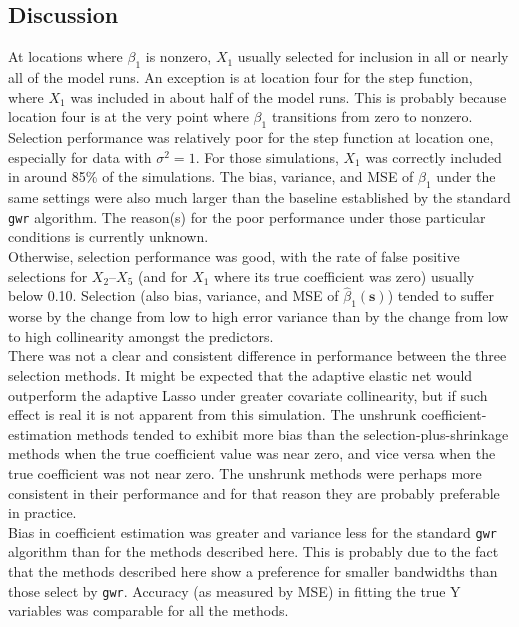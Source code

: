 \documentclass[authoryear, review, 11pt]{elsarticle}
\begin{document}
		
	\subsection{Discussion}
	At locations where $\beta_1$ is nonzero, $X_1$ usually selected for inclusion in all or nearly all of the model runs. An exception is at location four for the step function, where $X_1$ was included in about half of the model runs. This is probably because location four is at the very point where $\beta_1$ transitions from zero to nonzero. Selection performance was relatively poor for the step function at location one, especially for data with $\sigma^2 = 1$. For those simulations, $X_1$ was correctly included in around 85\% of the simulations. The bias, variance, and MSE of $\hat{\beta}_1$ under the same settings were also much larger than the baseline established by the standard \verb!gwr! algorithm. The reason(s) for the poor performance under those particular conditions is currently unknown.\\
	
	Otherwise, selection performance was good, with the rate of false positive selections for $X_2$--$X_5$ (and for $X_1$ where its true coefficient was zero) usually below 0.10. Selection (also bias, variance, and MSE of $\hat{\beta}_1(\bm{s})$) tended to suffer worse by the change from low to high error variance than by the change from low to high collinearity amongst the predictors.\\
	
	There was not a clear and consistent difference in performance between the three selection methods. It might be expected that the adaptive elastic net would outperform the adaptive Lasso under greater covariate collinearity, but if such effect is real it is not apparent from this simulation. The unshrunk coefficient-estimation methods tended to exhibit more bias than the selection-plus-shrinkage methods when the true coefficient value was near zero, and vice versa when the true coefficient was not near zero. The unshrunk methods were perhaps more consistent in their performance and for that reason they are probably preferable in practice.\\
	
	Bias in coefficient estimation was greater and variance less for the standard \verb!gwr! algorithm than for the methods described here. This is probably due to the fact that the methods described here show a preference for smaller bandwidths than those select by \verb!gwr!. Accuracy (as measured by MSE) in fitting the true Y variables was comparable for all the methods. \\	
	
\end{document}
